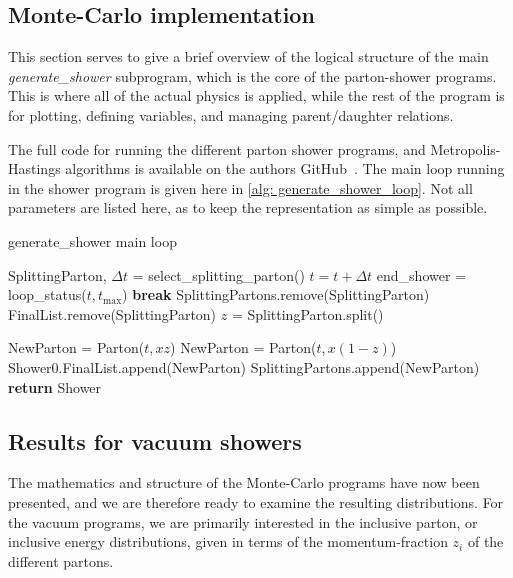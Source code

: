 \documentclass[main.tex]{subfiles}
\begin{document}
\subsection{Monte-Carlo implementation}\label{sec: MC_implementation_vacuum}
This section serves to give a brief overview of the logical structure of the main \textit{generate\_shower} subprogram, which is the core of the parton-shower programs. This is where all of the actual physics is applied, while the rest of the program is for plotting, defining variables, and managing parent/daughter relations.

The full code for running the different parton shower programs, and Metropolis-Hastings algorithms is available on the authors GitHub~\cite{GitHub_thesis}. The main loop running in the shower program is given here in \autoref{alg: generate_shower_loop}. Not all parameters are listed here, as to keep the representation as simple as possible.
\begin{center}
\begin{minipage}{.8\linewidth}
\begin{algorithm}[H]
\caption{generate\_shower main loop}
\label{alg: generate_shower_loop}
\begin{algorithmic}[1]
    \State SplittingParton, \(\Delta t\) = select\_splitting\_parton()
    \State \(t = t + \Delta t\)
    \State end\_shower = loop\_status(\(t, t_{\text{max}}\)) 
        \State \textbf{break}
        \EndIf
    \State SplittingPartons.remove(SplittingParton)
    \State FinalList.remove(SplittingParton)
    \State $z$ = SplittingParton.split()
    
            \State NewParton = Parton(\(t, xz\))
            \State NewParton = Parton(\(t, x (1-z)\))
            \EndIf
            \EndFor
    \State Shower0.FinalList.append(NewParton)
        \State SplittingPartons.append(NewParton)
        \EndIf
    \EndWhile
    \State \textbf{return} Shower
\end{algorithmic}
\end{algorithm}
\end{minipage}
\end{center}

\subsection{Results for vacuum showers}
The mathematics and structure of the Monte-Carlo programs have now been presented, and we are therefore ready to examine the resulting distributions. For the vacuum programs, we are primarily interested in the inclusive parton, or inclusive energy distributions, given in terms of the momentum-fraction \(z_i\) of the different partons. 
\end{document}

